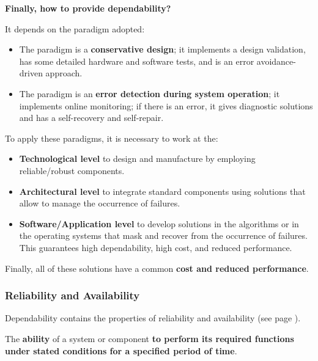 \highspace
\begin{flushleft}
    \textcolor{Green3}{ \textbf{Finally, how to provide dependability?}}
\end{flushleft}
It depends on the paradigm adopted:
\begin{itemize}
    \item The  paradigm is a \textbf{conservative design}; it implements a design validation, has some detailed hardware and software tests, and is an error avoidance-driven approach.

    \item The  paradigm is an \textbf{error detection during system operation}; it implements online monitoring; if there is an error, it gives diagnostic solutions and has a self-recovery and self-repair.
\end{itemize}
To apply these paradigms, it is necessary to work at the:
\begin{itemize}
    \item \textbf{Technological level} to design and manufacture by employing reliable/robust components.

    \item \textbf{Architectural level} to integrate standard components using solutions that allow to manage the occurrence of failures.

    \item \textbf{Software/Application level} to develop solutions in the algorithms or in the operating systems that mask and recover from the occurrence of failures. This guarantees high dependability, high cost, and reduced performance.
\end{itemize}
Finally, all of these solutions have a common \textbf{cost and reduced performance}.

\newpage

\subsubsection{Reliability and Availability}

Dependability contains the properties of reliability and availability (see page \pageref{subsubsection: introduction - dependability}).

\highspace
\begin{definitionbox}[: Reliability]
    The \textbf{ability} of a system or component \textbf{to perform its required functions under stated conditions for a specified period of time}.
\end{definitionbox}

